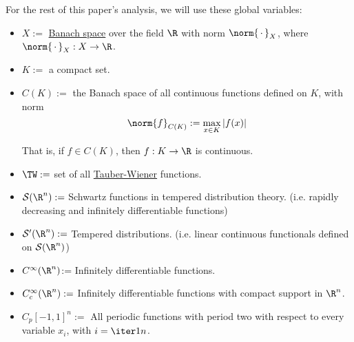 For the rest of this paper's analysis, we will use these global variables:
\begin{itemize}
  \item $X:=$ \href{f894cb0}{Banach space} over the field $\R$ with norm
        $\norm{\,\cdot\,}_X$, where $\norm{\,\cdot\,}_X:X\to\R$.
  \item $K:=$ a compact set.
  \item $C(K):=$ the Banach space of all continuous functions defined on $K$,
        with norm
        $$
          \norm{f}_{C(K)}:=\max_{x\in K}|f(x)|
        $$

        That is, if $f\in C(K)$, then $f:K\to\R$ is continuous.
  \item $\TW:=$ set of all \href{e65fc0e}{Tauber-Wiener} functions.
  \item $\mathcal S(\R^n):=$ Schwartz functions in tempered distribution theory.
        (i.e. rapidly decreasing and infinitely differentiable functions)
  \item $\mathcal S'(\R^n):=$ Tempered distributions. (i.e. linear continuous
        functionals defined on $\mathcal S(\R^n)$)
  \item $C^\infty(\R^n)$:= Infinitely differentiable functions.
  \item $C^\infty_c(\R^n):=$ Infinitely differentiable functions with compact
        support in $\R^n$.
  \item $C_p[-1,1]^n:=$ All periodic functions with period two with respect
        to every variable $x_i$, with $i=\iter1n$.
\end{itemize}
